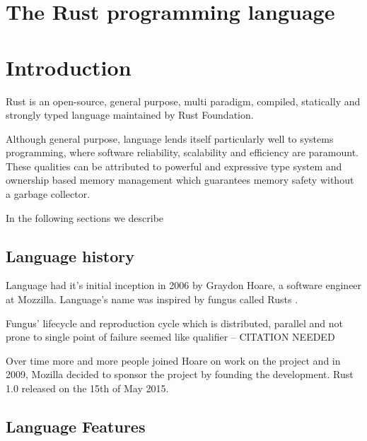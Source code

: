 
\chapter{The Rust programming language}

\chapter*{Introduction}

Rust is an open-source, general purpose, multi paradigm, compiled, statically and strongly typed language maintained by Rust Foundation.

Although general purpose, language lends itself particularly well to systems programming, where software reliability, scalability and efficiency are paramount.
These qualities can be attributed to powerful and expressive type system and ownership based memory management which guarantees memory safety without a garbage collector.

In the following sections we describe

\section{Language history}

Language had it's initial inception in 2006 by Graydon Hoare, a software engineer at Mozzilla. Language's name was inspired by fungus called Rusts \cite{thompson2023rust}. 

Fungus' lifecycle and reproduction cycle which is distributed, parallel and not prone to single point of failure seemed like qualifier -- CITATION NEEDED

Over time more and more people joined Hoare on work on the project and in 2009, Mozilla decided to sponsor the project by founding the development. Rust 1.0 released on the 15th of May 2015.

\section{Language Features}

\subsection{}
